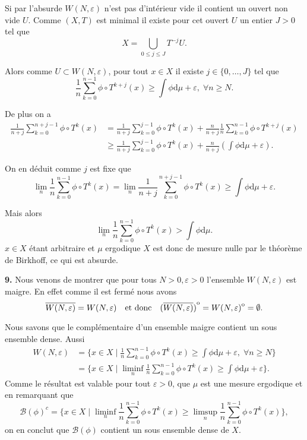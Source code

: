 \documentclass[12pt]{article}
\newcommand{\de}{\mathrm{d}}
\newcommand{\interior}[1]{%
  {\kern0pt#1}^{\mathrm{o}}%
}
\begin{document}
\medskip

Si par l'absurde $W(N,\varepsilon)$ n'est pas d'intérieur vide il contient un ouvert non vide $U$. Comme $(X,T)$ est minimal il existe pour cet ouvert  $U$ un entier $J > 0$ tel que  \[
X = \bigcup_{0\le j \le J}T^{-j}U
.\] 

Alors comme $U \subset W(N,\varepsilon)$, pour tout $x \in X$ il existe $j \in \{0, \ldots, J\}$ tel que \[
        \frac{1}{n}\sum_{k=0}^{n-1} \phi\circ T^{k+j}(x) \ge \int\phi\de\mu + \varepsilon, \; \forall n \ge N
.\] 

De plus on a
\begin{align*}
        \frac{1}{n+j}\sum_{k=0}^{n+j-1} \phi\circ T^{k}(x) &= \frac{1}{n+j}\sum_{k=0}^{j-1} \phi\circ T^{k}(x) + \frac{n}{n+j}\frac{1}{n}\sum_{k=0}^{n-1} \phi\circ T^{k+j}(x) \\
                                                           &\ge \frac{1}{n+j}\sum_{k=0}^{j-1} \phi\circ T^{k}(x) + \frac{n}{n+j}(\int\phi\de\mu + \varepsilon)
.\end{align*}

On en déduit comme $j$ est fixe que \[
        \lim_{n}\frac{1}{n}\sum_{k=0}^{n-1} \phi\circ T^{k}(x) = \lim_{n}\frac{1}{n+j}\sum_{k=0}^{n+j-1} \phi\circ T^{k}(x) \ge \int\phi\de\mu + \varepsilon
.\] 

Mais alors \[
\lim_{n}\frac{1}{n}\sum_{k=0}^{n-1} \phi\circ T^{k}(x) > \int\phi\de\mu 
.\] $x \in X$ étant arbitraire et $\mu$ ergodique $X$ est donc de mesure nulle par le théorème de Birkhoff, ce qui est absurde. 

\bigskip

\textbf{9.} Nous venons de montrer que pour tous $N >0, \varepsilon > 0$ l'ensemble $W(N,\varepsilon)$ est maigre. En effet comme il est fermé nous avons  \[
        \overline{W(N,\varepsilon)} = W(N,\varepsilon) \quad \text{et donc} \quad \interior{(\overline{W(N,\varepsilon)})} = \interior{W(N,\varepsilon)} = \emptyset 
.\] 

Nous savons que le complémentaire d'un ensemble maigre contient un sous ensemble dense. Aussi
\begin{align*}
        W(N, \varepsilon) &= \{x\in X \;|\; \frac{1}{n}\sum_{k=0}^{n-1} \phi\circ T^{k}(x) \ge \int\phi\de\mu + \varepsilon, \; \forall n \ge N\} \\
                          &= \{x \in X \;|\; \liminf_{n} \frac{1}{n}\sum_{k=0}^{n-1} \phi\circ T^{k}(x) \ge \int\phi\de\mu + \varepsilon\}
.\end{align*}
Comme le résultat est valable pour tout $\varepsilon > 0$, que $\mu$ est une mesure ergodique et en remarquant que  \[
        \mathcal{B}(\phi)^{c} = \{x\in X \;|\; \liminf_{n}\frac{1}{n}\sum_{k=0}^{n-1} \phi\circ T^{k}(x) \ge \limsup_{n} \frac{1}{n}\sum_{k=0}^{n-1} \phi\circ T^{k}(x)\} 
,\] on en conclut que $\mathcal{B}(\phi)$ contient un sous ensemble dense de $X$. 
\end{document}
